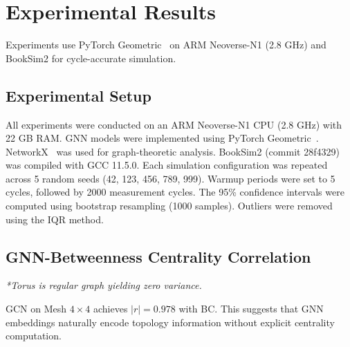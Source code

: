 \documentclass[conference]{IEEEtran}
\begin{document}
\section{Experimental Results}
\label{sec:results}

Experiments use PyTorch Geometric~\cite{pyg2019} on ARM Neoverse-N1 (2.8 GHz) and BookSim2 for cycle-accurate simulation.

\subsection{Experimental Setup}

All experiments were conducted on an ARM Neoverse-N1 CPU (2.8 GHz) with 22 GB RAM. GNN models were implemented using PyTorch Geometric~\cite{pyg2019}. NetworkX~\cite{networkx2008} was used for graph-theoretic analysis. BookSim2 (commit 28f4329) was compiled with GCC 11.5.0. Each simulation configuration was repeated across 5 random seeds (42, 123, 456, 789, 999). Warmup periods were set to 5 cycles, followed by 2000 measurement cycles. The 95\% confidence intervals were computed using bootstrap resampling (1000 samples). Outliers were removed using the IQR method.

\subsection{GNN-Betweenness Centrality Correlation}

\begin{table}[h]
\centering
\caption{Maximum Pearson $|r|$ between GNN embedding and BC}
\label{tab:correlation}
\vspace{1mm}
\small\textit{*Torus is regular graph yielding zero variance.}
\end{table}

GCN on Mesh $4\times4$ achieves $|r|=0.978$ with BC. This suggests that GNN embeddings naturally encode topology information without explicit centrality computation.
\end{document}
